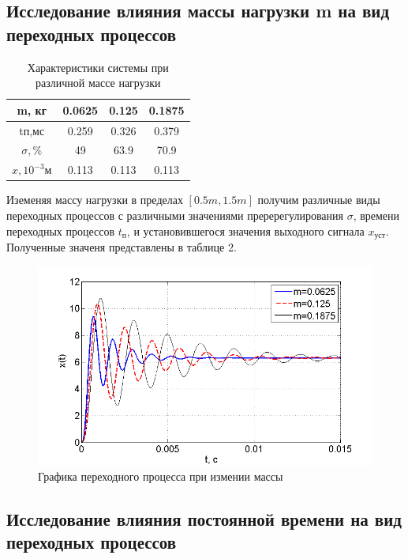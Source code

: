 \documentclass[a4paper, 12pt]{article}
\renewcommand{\arraystretch}{1.5}
\begin{document}
\newpage
\begin{center}
	\section{Исследование влияния массы нагрузки m на вид переходных процессов}
\end{center}\par

	\begin{table}[h!]
		\centering
		\begin{threeparttable}
		
	\caption{Характеристики системы при различной массе нагрузки }
	\renewcommand{\arraystretch}{1}
	\renewcommand{\tabcolsep}{0.9cm}
	\begin{tabular}{|c|c|c|c|}
		\hline
		m, кг	&	0.0625	&	0.125	&	0.1875		\\
		\hline
		tп,мс	&	0.259	&	0.326	&	0.379		\\
		\hline
		$\sigma, \%$	&	49	&	63.9	&	70.9		\\
		\hline
		$x,10^{-3}м$	&	0.113	&	0.113	&	0.113		\\
		\hline
	\end{tabular}
\end{threeparttable}
\end{table}

Иземеняя массу нагрузки в пределах $[0.5m, 1.5m]$ получим различные виды переходных процессов с различными значениями преререгулирования $\sigma$, времени переходных процессов $t_\text{п}$, и установившегося значения выходного сигнала $x_\text{уст}$. Полученные значеня представлены в таблице 2.
\newpage
\begin{figure}[h]
	\centering
	\includegraphics[width=0.7\linewidth]{12}
	\caption{Графика переходного процесса при измении массы}
	\label{fig:5}
\end{figure}
\newpage


\begin{center}
	\section{Исследование влияния постоянной времени на вид переходных процессов}
\end{center}
\end{document}

